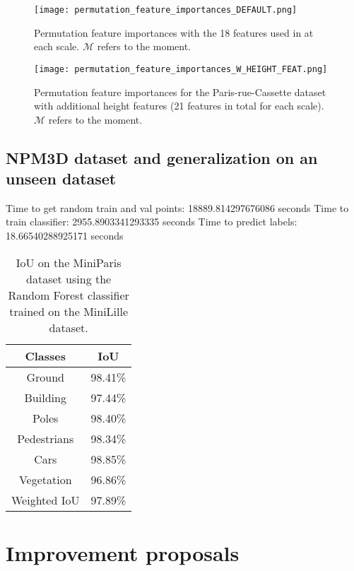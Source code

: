 \documentclass{article}
\begin{document}
\begin{figure}
    \hspace*{-2cm}
    \texttt{[image: permutation\_feature\_importances\_DEFAULT.png]}
    \caption{Permutation feature importances with the 18 features used in \cite{thomas_semantic_2018} at each scale. $\mathcal{M}$ refers to the moment.}
    \label{fig:permutation_default}
\end{figure}
\begin{figure}
    \hspace*{-2cm}
        \texttt{[image: permutation\_feature\_importances\_W\_HEIGHT\_FEAT.png]}
    \caption{Permutation feature importances for the Paris-rue-Cassette dataset with additional height features (21 features in total for each scale). $\mathcal{M}$ refers to the moment.}
    \label{fig:permutation_height}
\end{figure}




\subsection{NPM3D dataset and generalization on an unseen dataset}\label{sec:generalization}

Time to get random train and val points: 18889.814297676086 seconds
Time to train classifier: 2955.8903341293335 seconds
Time to predict labels: 18.66540288925171 seconds

\begin{table}[H]
    \centering
\begin{tabular}{cc}
    Classes & IoU \\
    \hline\hline
    Ground & 98.41\% \\
    Building & 97.44\% \\
    Poles & 98.40\% \\
    Pedestrians & 98.34\% \\
    Cars & 98.85\% \\
    Vegetation & 96.86\% \\
    \hline 
    Weighted IoU & 97.89\% \\
\end{tabular}
\caption{IoU on the MiniParis dataset using the Random Forest classifier trained on the MiniLille dataset.}
\end{table}

\section{Improvement proposals}
\end{document}

